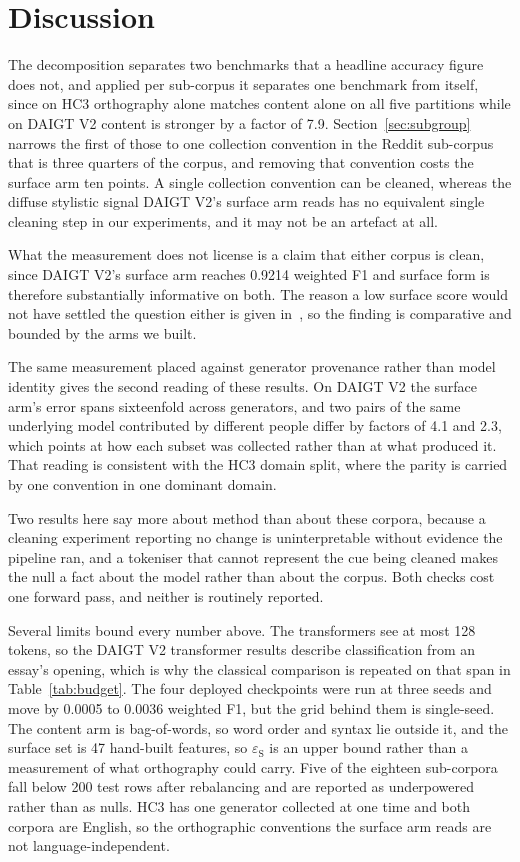 \section{Discussion}
\label{sec:limits}

The decomposition separates two benchmarks that a headline accuracy figure does not, and applied per sub-corpus it separates one benchmark from itself, since on HC3 orthography alone matches content alone on all five partitions while on DAIGT V2 content is stronger by a factor of 7.9. Section~\ref{sec:subgroup} narrows the first of those to one collection convention in the Reddit sub-corpus that is three quarters of the corpus, and removing that convention costs the surface arm ten points. A single collection convention can be cleaned, whereas the diffuse stylistic signal DAIGT V2's surface arm reads has no equivalent single cleaning step in our experiments, and it may not be an artefact at all.

What the measurement does not license is a claim that either corpus is clean, since DAIGT V2's surface arm reaches 0.9214 weighted F1 and surface form is therefore substantially informative on both. The reason a low surface score would not have settled the question either is given in~\cite{Feng2019misleading}, so the finding is comparative and bounded by the arms we built.

The same measurement placed against generator provenance rather than model identity gives the second reading of these results. On DAIGT V2 the surface arm's error spans sixteenfold across generators, and two pairs of the same underlying model contributed by different people differ by factors of 4.1 and 2.3, which points at how each subset was collected rather than at what produced it. That reading is consistent with the HC3 domain split, where the parity is carried by one convention in one dominant domain.

Two results here say more about method than about these corpora, because a cleaning experiment reporting no change is uninterpretable without evidence the pipeline ran, and a tokeniser that cannot represent the cue being cleaned makes the null a fact about the model rather than about the corpus. Both checks cost one forward pass, and neither is routinely reported.

Several limits bound every number above. The transformers see at most 128 tokens, so the DAIGT V2 transformer results describe classification from an essay's opening, which is why the classical comparison is repeated on that span in Table~\ref{tab:budget}. The four deployed checkpoints were run at three seeds and move by 0.0005 to 0.0036 weighted F1, but the grid behind them is single-seed. The content arm is bag-of-words, so word order and syntax lie outside it, and the surface set is 47 hand-built features, so $\varepsilon_{\mathrm{S}}$ is an upper bound rather than a measurement of what orthography could carry. Five of the eighteen sub-corpora fall below 200 test rows after rebalancing and are reported as underpowered rather than as nulls. HC3 has one generator collected at one time and both corpora are English, so the orthographic conventions the surface arm reads are not language-independent.

